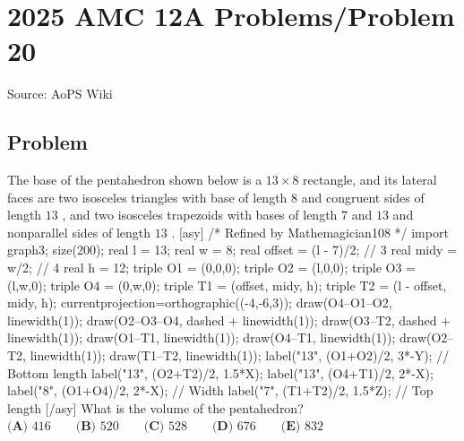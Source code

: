 \documentclass[12pt]{article}
\begin{document}
\section*{{2025 AMC 12A Problems/Problem 20}}
Source: AoPS Wiki

\subsection*{Problem}
The base of the pentahedron shown below is a $13 \times 8$ rectangle, and its lateral faces are two isosceles triangles with base of length $8$ and congruent sides of length $13$ , and two isosceles trapezoids with bases of length $7$ and $13$ and nonparallel sides of length $13$ . [asy] /* Refined by Mathemagician108 */ import graph3; size(200); real l = 13; real w = 8; real offset = (l - 7)/2; // 3 real midy = w/2; // 4 real h = 12; triple O1 = (0,0,0); triple O2 = (l,0,0); triple O3 = (l,w,0); triple O4 = (0,w,0); triple T1 = (offset, midy, h); triple T2 = (l - offset, midy, h); currentprojection=orthographic((-4,-6,3)); draw(O4--O1--O2, linewidth(1)); draw(O2--O3--O4, dashed + linewidth(1)); draw(O3--T2, dashed + linewidth(1)); draw(O1--T1, linewidth(1)); draw(O4--T1, linewidth(1)); draw(O2--T2, linewidth(1)); draw(T1--T2, linewidth(1)); label("13", (O1+O2)/2, 3*-Y); // Bottom length label("13", (O2+T2)/2, 1.5*X); label("13", (O4+T1)/2, 2*-X); label("8", (O1+O4)/2, 2*-X); // Width label("7", (T1+T2)/2, 1.5*Z); // Top length [/asy] What is the volume of the pentahedron? $\textbf{(A) } 416 \qquad \textbf{(B) } 520 \qquad \textbf{(C) } 528 \qquad \textbf{(D) } 676 \qquad \textbf{(E) } 832$
\end{document}

